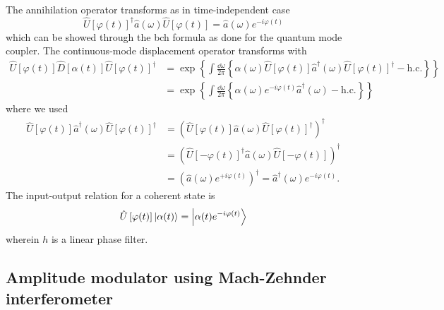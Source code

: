 The annihilation operator transforms as in time-independent case~\cite[p.~38]{Leonhardt2010}
\begin{equation}
	\hat{U}\left[\varphi(t)\right]^\dagger
	\hat{a}(\omega)
	\hat{U}\left[\varphi(t)\right]
	=
	\hat{a}(\omega)
	e^{-i\varphi(t)}
\end{equation}
which can be showed through the \gls{bch} formula as done for the quantum mode coupler.
The continuous-mode displacement operator transforms with 
\begin{equation}
	\begin{split}
		\hat{U}\left[\varphi(t)\right]
		\hat{D}\left[\alpha(t)\right]
		\hat{U}\left[\varphi(t)\right]^\dagger
		&=
		\exp\left\{
			\int\frac{\dd{\omega}}{2\pi}
			\left\{
				\alpha(\omega)
				\hat{U}\left[\varphi(t)\right]
				\hat{a}^\dagger(\omega)
				\hat{U}\left[\varphi(t)\right]^\dagger
				-
				\text{h.c.}
			\right\}
		\right\}
		\\
		&=
		\exp\left\{
			\int\frac{\dd{\omega}}{2\pi}
			\left\{
				\alpha(\omega)
				e^{-i\varphi(t)}
				\hat{a}^\dagger(\omega)
				-
				\text{h.c.}
			\right\}
		\right\}
	\end{split}
\end{equation}
where we used
\begin{equation}
	\begin{split}
		\hat{U}\left[\varphi(t)\right]
		\hat{a}^\dagger(\omega)
		\hat{U}\left[\varphi(t)\right]^\dagger
		&=
		\left(
			\hat{U}\left[\varphi(t)\right]
			\hat{a}(\omega)
			\hat{U}\left[\varphi(t)\right]^\dagger
		\right)^\dagger
		\\
		&=
		\left(
			\hat{U}\left[-\varphi(t)\right]^\dagger
			\hat{a}(\omega)
			\hat{U}\left[-\varphi(t)\right]
		\right)^\dagger
		\\
		&=
		\left(
			\hat{a}(\omega)
			e^{+i\varphi(t)}
		\right)^\dagger
		=
		\hat{a}^\dagger(\omega)
		e^{-i\varphi(t)}
		.
	\end{split}
\end{equation}
The input-output relation for a coherent state is
\begin{equation}
	\hat{U}\left[\varphi(t)\right]
	\ket*{\alpha(t)}
	=
	\ket*{\alpha(t)e^{-i\varphi(t)}}
\end{equation}
wherein $h$ is a linear phase filter.

\subsection{Amplitude modulator using Mach-Zehnder interferometer}

